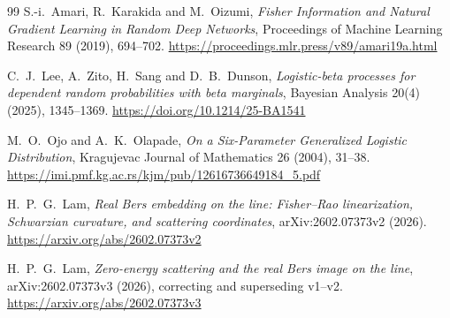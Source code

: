 \documentclass[11pt]{article}
\begin{document}
\begin{thebibliography}{99}
S.-i.~Amari, R.~Karakida and M.~Oizumi,
\emph{Fisher Information and Natural Gradient Learning in Random Deep Networks},
Proceedings of Machine Learning Research 89 (2019), 694--702.
\url{https://proceedings.mlr.press/v89/amari19a.html}

C.~J.~Lee, A.~Zito, H.~Sang and D.~B.~Dunson,
\emph{Logistic-beta processes for dependent random probabilities with beta marginals},
Bayesian Analysis 20(4) (2025), 1345--1369.
\url{https://doi.org/10.1214/25-BA1541}

M.~O.~Ojo and A.~K.~Olapade,
\emph{On a Six-Parameter Generalized Logistic Distribution},
Kragujevac Journal of Mathematics 26 (2004), 31--38.
\url{https://imi.pmf.kg.ac.rs/kjm/pub/12616736649184_5.pdf}

H.~P.~G.~Lam,
\emph{Real Bers embedding on the line: Fisher--Rao linearization, Schwarzian curvature, and scattering coordinates},
arXiv:2602.07373v2 (2026).
\url{https://arxiv.org/abs/2602.07373v2}

H.~P.~G.~Lam,
\emph{Zero-energy scattering and the real Bers image on the line},
arXiv:2602.07373v3 (2026), correcting and superseding v1--v2.
\url{https://arxiv.org/abs/2602.07373v3}
\end{thebibliography}
\end{document}
